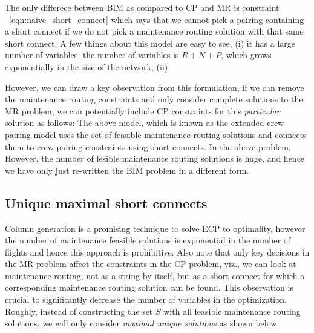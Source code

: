\documentclass[letterpaper, 10pt, twocolumn, reqno]{amsart}
\begin{document}
The only differece between BIM as compared to CP and MR is constraint ~\eqref{eqn:naive_short_connect} which says that we cannot pick a pairing containing a short connect if we do not pick a maintenance routing solution with that same short connect. A few things about this model are easy to see, (i) it has a large number of variables, the number of variables is $R + N+P$, which grows exponentially in the size of the network, (ii) 

However, we can draw a key observation from this formulation, if we can remove the maintenance routing constraints and only consider complete solutions to the MR problem, we can potentially include CP constraints for this \emph{particular} solution as follows:
The above model, which is known as the extended crew pairing model uses the set of feasible maintenance routing solutions and connects them to crew pairing constraints using short connects. In the above problem,
However, the number of fesible maintenance routing solutions is huge, and hence we have only just re-written the BIM problem in a different form.

\subsection{Unique maximal short connects}
\label{ssec:unique_maximal_sc}

Column generation is a promising technique to solve ECP to optimality, however the number of maintenance feasible solutions is exponential in the number of flights and hence this approach is prohibitive. Also note that only key decisions in the MR problem affect the constraints in the CP problem, viz., we can look at maintenance routing, not as a string by itself, but as a short connect for which a corresponding maintenance routing solution can be found. This observation is crucial to significantly decrease the number of variables in the optimization. Roughly, instead of constructing the set $S$ with all feasible maintenance routing solutions, we will only consider \emph{maximal unique solutions} as shown below.
\end{document}
